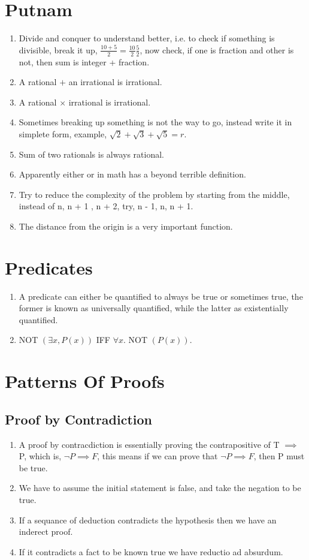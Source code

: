 \documentclass{article}
\DeclareMathOperator{\Exists}{\exists}
\DeclareMathOperator{\Forall}{\forall}
\begin{document}
	\section{Putnam}
	\begin{enumerate}
		\item  Divide and conquer to understand better, i.e. to check if something is divisible, break it up, $\frac{10 + 5}{2} = \frac{10}{2} \frac{5}{2}$, now check, if one is fraction and other is not, then sum is integer + fraction.
		\item A rational $+$ an irrational is irrational.
		\item A rational $\times$ irrational is irrational.
		\item Sometimes breaking up something is not the way to go, instead write it in simplete form, example, $\sqrt{2} + \sqrt{3} + \sqrt{5} = r$.       
		\item Sum of two rationals is always rational.
		\item Apparently either or in math has a beyond terrible definition.
		\item Try to reduce the complexity of the problem by starting from the middle, instead of n, n + 1 , n + 2,  try, n - 1, n, n + 1.
		\item The distance from the origin is a very important function.
	\end{enumerate}
	\section{Predicates}
	\begin{enumerate}
		\item  A predicate can either be quantified to always be true or  sometimes true, the former is known as universally quantified, while the latter as existentially quantified.
			
		\item NOT $(\Exists x, P(x))$ IFF $\Forall x.$ NOT $(P(x))$.
	\end{enumerate}	
	\section{Patterns Of Proofs}
	\subsection{Proof by Contradiction}
\begin{enumerate}

\item A proof by contracdiction is essentially proving the contrapositive of T $\implies$ P, which is, $\neg P \implies F$, this means if we can prove that $\neg P \implies F$, then P must be true.
\item We have to assume the initial statement is false, and take the negation to be true.
\item If a sequance of deduction contradicts the hypothesis then we have an inderect proof.
\item If it contradicts a fact to be known true we have reductio ad absurdum.
\end{enumerate}
\end{document}
